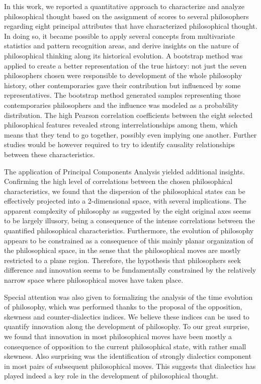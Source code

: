 \documentclass[%
 aip,
 jmp,%
 amsmath,amssymb,
 reprint,%
]{revtex4-1}
\begin{document}
In this work, we reported a quantitative approach to characterize and
analyze philosophical thought based on the assignment of scores to
several philosophers regarding eight principal attributes that have
characterized philosophical thought.  In doing so, it became possible
to apply several concepts from multivariate statistics and pattern
recognition areas, and derive insights on the nature of philosophical
thinking along its historical evolution.  A bootstrap method was
applied to create a better representation of the true history: not
just the seven philosophers chosen were responsible to development of
the whole philosophy history, other contemporaries gave their
contribution but influenced by some representatives. The bootstrap
method generated samples representing those contemporaries
philosophers and the influence was modeled as a probability
distribution. The high Pearson correlation
coefficients between the eight selected philosophical features
revealed strong interrelationships among them, which means that they
tend to go together, possibly even implying one another.  Further
studies would be however required to try to identify causality
relationships between these characteristics.

The application of Principal Components Analysis yielded additional
insights.  Confirming the high level of correlations between the
chosen philosophical characteristics, we found that the dispersion of
the philosophical states can be effectively projected into a
2-dimensional space, with several implications.  The apparent
complexity of philosophy as suggested by the eight original axes seems
to be largely illusory, being a consequence of the intense
correlations between the quantified philosophical characteristics.
Furthermore, the evolution of philosophy appears to be constrained as
a consequence of this mainly planar organization of the philosophical
space, in the sense that the philosophical moves are mostly restricted
to a plane region. Therefore, the hypothesis that philosophers seek
difference and innovation seems to be fundamentally constrained by the
relatively narrow space where philosophical moves have taken place.

Special attention was also given to formalizing the analysis of the
time evolution of philosophy, which was performed thanks to the
proposal of the opposition, skewness and counter-dialectics indices.
We believe these indices can be used to quantify innovation along the
development of philosophy.  To our great surprise, we found that
innovation in most philosophical moves have been mostly a consequence
of opposition to the current philosophical state, with rather small
skewness.  Also surprising was the identification of strongly
dialectics component in most pairs of subsequent philosophical moves.
This suggests that dialectics has played indeed a key role in the
development of philosophical thought.
\end{document}
